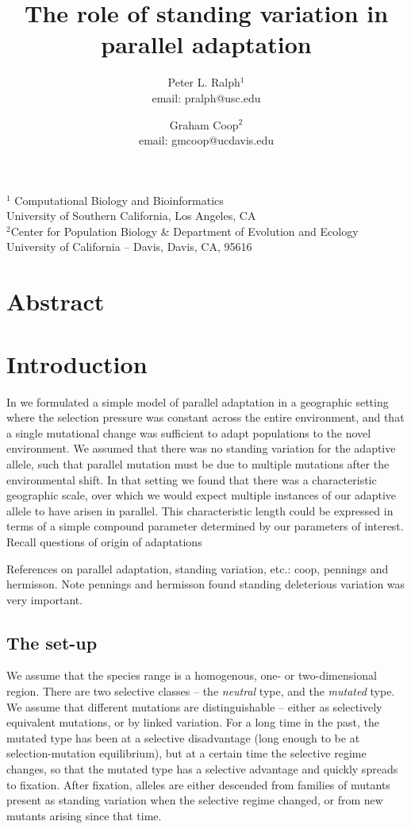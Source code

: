 \documentclass{article}
\title{The role of standing variation in parallel adaptation}
\author{Peter L. Ralph$^1$ \\ email: pralph@usc.edu  \and Graham Coop$^2$ \\ email: gmcoop@ucdavis.edu }
\begin{document}
\maketitle
\date{}

\begin{center}

$^1$ Computational Biology and Bioinformatics \\ 
University of Southern California, Los Angeles, CA \\
$^2$Center for Population Biology \& Department of Evolution and Ecology \\ 
University of California -- Davis, Davis, CA, 95616
\end{center}

\section*{Abstract}

\section{Introduction}


In \citep{RalphCoop} we formulated a simple model of parallel adaptation in a geographic setting
where the selection pressure was constant across the entire environment, 
and that a single mutational change was sufficient to adapt populations to the novel environment. 
We assumed that there was no standing variation for the adaptive allele, such that parallel mutation must be due to multiple mutations after the environmental shift. In that setting we found that there was a characteristic geographic scale, over which we would expect multiple instances of our adaptive allele to have arisen in parallel. This characteristic length could be expressed in terms of a simple compound parameter determined by our parameters of interest.
Recall questions of origin of adaptations

References on parallel adaptation, standing variation, etc.:
  coop,
  pennings and hermisson.
Note pennings and hermisson found standing deleterious variation was very important.  

\subsection{The set-up}


We assume that the species range
is a homogenous, one- or two-dimensional region. 
There are two selective classes -- the {\em neutral} type, and the {\em mutated} type.
We assume that different mutations are distinguishable --
either as selectively equivalent mutations, or by linked variation.
For a long time in the past, the mutated type has been at a selective disadvantage (long enough to be at selection-mutation equilibrium),
but at a certain time the selective regime changes, so that the mutated type has a selective advantage and quickly spreads to fixation.
After fixation, alleles are either descended
from families of mutants present as standing variation when the selective regime changed,
or from new mutants arising since that time.
\end{document}
